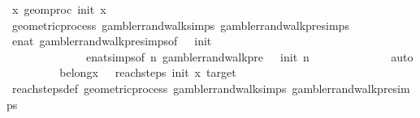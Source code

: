 \begin{isabellebody}
\ {\isachardoublequoteopen}{\isasymAnd}x{\isachardot}{\kern0pt}\ geom{\isacharunderscore}{\kern0pt}proc\ init\ x\ {}\ {\isacharequal}{\kern0pt}\ {}{\isachardoublequoteclose}\isanewline
\ \ \ \ \ \ \ \ \isamarkupfalse%
\ geometric{\isacharunderscore}{\kern0pt}process\ gambler{\isacharunderscore}{\kern0pt}rand{\isacharunderscore}{\kern0pt}walk{\isachardot}{\kern0pt}simps\ gambler{\isacharunderscore}{\kern0pt}rand{\isacharunderscore}{\kern0pt}walk{\isacharunderscore}{\kern0pt}pre{\isachardot}{\kern0pt}simps\isanewline
\ \ \ \ \ \ \ \ \isamarkupfalse%
\ enat{\isacharunderscore}{\kern0pt}{}\ gambler{\isacharunderscore}{\kern0pt}rand{\isacharunderscore}{\kern0pt}walk{\isacharunderscore}{\kern0pt}pre{\isachardot}{\kern0pt}simps{\isacharparenleft}{\kern0pt}{}{\isacharparenright}{\kern0pt}{\isacharbrackleft}{\kern0pt}of\ {}\ {\isachardoublequoteopen}{\isacharminus}{\kern0pt}{}{\isachardoublequoteclose}\ init\ {\isacharunderscore}{\kern0pt}{\isacharbrackright}{\kern0pt}\ \isanewline
\ \ \ \ \ \ \ \ \ \ \ \ \ \ enat{\isachardot}{\kern0pt}simps{\isacharparenleft}{\kern0pt}{}{\isacharparenright}{\kern0pt}{\isacharbrackleft}{\kern0pt}of\ {\isachardoublequoteopen}{\isasymlambda}n{\isachardot}{\kern0pt}\ gambler{\isacharunderscore}{\kern0pt}rand{\isacharunderscore}{\kern0pt}walk{\isacharunderscore}{\kern0pt}pre\ {}\ {\isacharparenleft}{\kern0pt}{\isacharminus}{\kern0pt}{}{\isacharparenright}{\kern0pt}\ init\ n\ {\isacharunderscore}{\kern0pt}{\isachardoublequoteclose}\ {\isachardoublequoteopen}\ {\isacharminus}{\kern0pt}{}{\isachardoublequoteclose}\ {}{\isacharbrackright}{\kern0pt}\isanewline
\ \ \ \ \ \ \ \ \isamarkupfalse%
\ auto\isanewline
\ \ \ \ \ \ \isamarkupfalse%
\ \isamarkupfalse%
\ belong{\isacharunderscore}{\kern0pt}{}{\isacharcolon}{\kern0pt}{\isachardoublequoteopen}{\isasymforall}x{\isachardot}{\kern0pt}\ {}\ {\isasymin}\ reach{\isacharunderscore}{\kern0pt}steps\ init\ x\ target{\isachardoublequoteclose}\isanewline
\ \ \ \ \ \ \ \ \isamarkupfalse%
\ reach{\isacharunderscore}{\kern0pt}steps{\isacharunderscore}{\kern0pt}def\ geometric{\isacharunderscore}{\kern0pt}process\ gambler{\isacharunderscore}{\kern0pt}rand{\isacharunderscore}{\kern0pt}walk{\isachardot}{\kern0pt}simps\ gambler{\isacharunderscore}{\kern0pt}rand{\isacharunderscore}{\kern0pt}walk{\isacharunderscore}{\kern0pt}pre{\isachardot}{\kern0pt}simps{\isacharparenleft}{\kern0pt}{}{\isacharparenright}{\kern0pt}\isanewline

\end{isabellebody}
